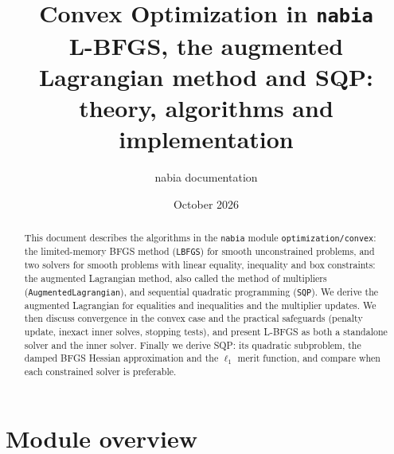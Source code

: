 \documentclass[11pt,a4paper]{article}
\title{Convex Optimization in \texttt{nabia}\\[0.3em]\large L-BFGS, the augmented Lagrangian method and SQP: theory, algorithms and implementation}
\author{nabia documentation}
\date{October 2026}
\begin{document}
\maketitle

\begin{abstract}
This document describes the algorithms in the \texttt{nabia} module
\texttt{optimization/convex}: the limited-memory BFGS method (\texttt{LBFGS})
for smooth unconstrained problems, and two solvers for smooth problems with
linear equality, inequality and box constraints: the augmented Lagrangian
method, also called the method of multipliers (\texttt{AugmentedLagrangian}),
and sequential quadratic programming (\texttt{SQP}). We derive the
augmented Lagrangian for equalities and inequalities and the multiplier updates. We then
discuss convergence in the convex case and the practical safeguards (penalty update,
inexact inner solves, stopping tests), and present L-BFGS as both a standalone
solver and the inner solver. Finally we derive SQP: its quadratic subproblem,
the damped BFGS Hessian approximation and the $\ell_1$ merit function, and
compare when each constrained solver is preferable.
\end{abstract}

\tableofcontents

\section{Module overview}
\end{document}
